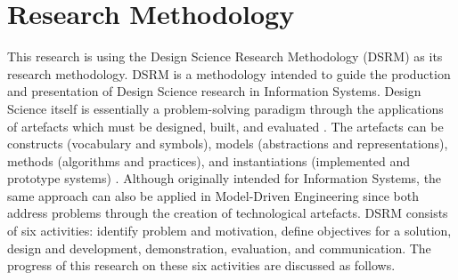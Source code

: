 \documentclass[12pt, a4paper]{report} \usepackage[titletoc]{appendix}
\begin{document}
\chapter{Research Methodology}
\label{ch:research_methodology}
This research is using the Design Science Research Methodology (DSRM) \cite{peffers2007design} as its research methodology. DSRM is a methodology intended to guide the production and presentation of Design Science research in Information Systems. Design Science itself is essentially a problem-solving paradigm through the applications of artefacts which must be designed, built, and evaluated \cite{hevner2010design}. The artefacts can be constructs (vocabulary and symbols), models (abstractions and representations), methods (algorithms and practices), and instantiations (implemented and prototype systems) \cite{hevner2004design}. Although originally intended for Information Systems, the same approach can also be applied in Model-Driven Engineering since both address problems through the creation of technological artefacts. DSRM consists of six activities: identify problem and motivation, define objectives for a solution, design and development, demonstration, evaluation, and communication. The progress of this research on these six activities are discussed as follows.
\end{document}
